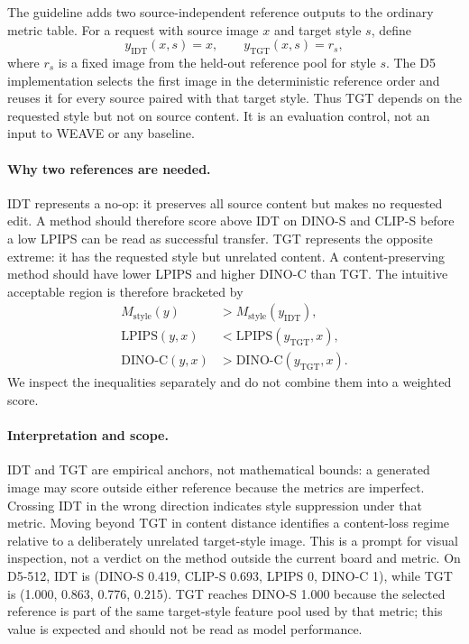\documentclass[10pt,twocolumn]{article}
\newcommand{\weave}{WEAVE}
\newcommand{\dinos}{DINO-S}
\newcommand{\dinoc}{DINO-C}
\newcommand{\clips}{CLIP-S}
\begin{document}
The guideline adds two source-independent reference outputs to the ordinary metric table.
For a request with source image $x$ and target style $s$, define
\begin{equation}
  y_{\mathrm{IDT}}(x,s)=x,
  \qquad
  y_{\mathrm{TGT}}(x,s)=r_s,
\end{equation}
where $r_s$ is a fixed image from the held-out reference pool for style $s$. The D5
implementation selects the first image in the deterministic reference order and reuses it
for every source paired with that target style. Thus TGT depends on the requested style but
not on source content. It is an evaluation control, not an input to \weave{} or any baseline.

\paragraph{Why two references are needed.}
IDT represents a no-op: it preserves all source content but makes no requested edit. A
method should therefore score above IDT on \dinos{} and \clips{} before a low LPIPS can be
read as successful transfer. TGT represents the opposite extreme: it has the requested
style but unrelated content. A content-preserving method should have lower LPIPS and higher
\dinoc{} than TGT. The intuitive acceptable region is therefore bracketed by
\begin{equation}
\begin{aligned}
M_{\mathrm{style}}(y)&>M_{\mathrm{style}}(y_{\mathrm{IDT}}),\\
\mathrm{LPIPS}(y,x)&<\mathrm{LPIPS}(y_{\mathrm{TGT}},x),\\
\mathrm{DINO\text{-}C}(y,x)&>\mathrm{DINO\text{-}C}(y_{\mathrm{TGT}},x).
\end{aligned}
\end{equation}
We inspect the inequalities separately and do not combine them into a weighted score.

\paragraph{Interpretation and scope.}
IDT and TGT are empirical anchors, not mathematical bounds: a generated image may score
outside either reference because the metrics are imperfect. Crossing IDT in the wrong
direction indicates style suppression under that metric. Moving beyond TGT in content
distance identifies a content-loss regime relative to a deliberately unrelated target-style
image. This is a prompt for visual inspection, not a verdict on the method outside the
current board and metric. On D5-512, IDT
is (\dinos{} 0.419, \clips{} 0.693, LPIPS 0, \dinoc{} 1), while TGT is
(1.000, 0.863, 0.776, 0.215). TGT reaches \dinos{} 1.000 because the selected reference is
part of the same target-style feature pool used by that metric; this value is expected and
should not be read as model performance.
\end{document}
